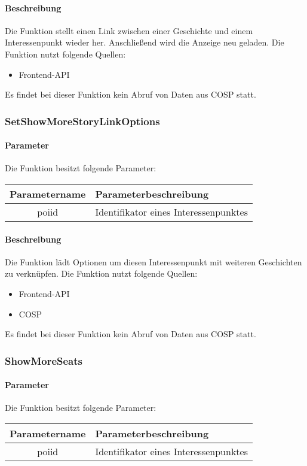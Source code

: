 \paragraph{Beschreibung} Die Funktion stellt einen Link zwischen einer Geschichte und einem Interessenpunkt wieder her. Anschließend wird die Anzeige neu geladen. Die Funktion nutzt folgende Quellen:
\begin{itemize}
	\item Frontend-API
\end{itemize}
Es findet bei dieser Funktion kein Abruf von Daten aus {\glqq COSP\grqq} statt.
\subsubsection{SetShowMoreStoryLinkOptions}
\paragraph{Parameter} Die Funktion besitzt folgende Parameter:
\begin{table}[H]
	\begin{tabular}{|c|p{11cm}|}
		\hline
		\textbf{Parametername} & \textbf{Parameterbeschreibung} \\ \hline
		poiid & Identifikator eines Interessenpunktes \\ \hline
	\end{tabular}
\end{table}
\paragraph{Beschreibung} Die Funktion lädt Optionen um diesen Interessenpunkt mit weiteren Geschichten zu verknüpfen. Die Funktion nutzt folgende Quellen:
\begin{itemize}
	\item Frontend-API
	\item COSP
\end{itemize}
Es findet bei dieser Funktion kein Abruf von Daten aus {\glqq COSP\grqq} statt.
\subsubsection{ShowMoreSeats}
\paragraph{Parameter} Die Funktion besitzt folgende Parameter:
\begin{table}[H]
	\begin{tabular}{|c|p{11cm}|}
		\hline
		\textbf{Parametername} & \textbf{Parameterbeschreibung} \\ \hline
		poiid & Identifikator eines Interessenpunktes \\ \hline
	\end{tabular}
\end{table}
